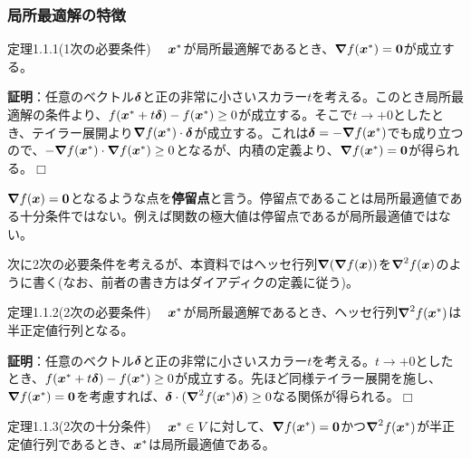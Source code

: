 \documentclass[dvipdfmx, 9pt, a4paper]{jsarticle}
\numberwithin{equation}{section}
\newcommand{\bm}[1]{{\mbox{\boldmath $#1$}}}
\newcommand{\bnabla}{\bm \nabla}
\def\qed{\hfill $\Box$}
\begin{document}
\subsubsection{局所最適解の特徴}
\begin{itembox}[l]{定理1.1.1(1次の必要条件)}
　$\bm x^*$が局所最適解であるとき、$\bnabla f(\bm x^*)=\bm 0$が成立する。
\end{itembox}
{\bf 証明}：任意のベクトル$\bm \delta$と正の非常に小さいスカラー$t$を考える。このとき局所最適解の条件より、$f(\bm x^*+t\bm \delta)-f(\bm x^*) \geq 0$が成立する。そこで$t \to +0$としたとき、テイラー展開より$\bm \nabla f(\bm x^*)\cdot \bm \delta$が成立する。これは$\bm \delta=-\bm \nabla f(\bm x^*)$でも成り立つので、$-\bm \nabla f(\bm x^*)\cdot \bm \nabla f(\bm x^*) \geq 0$となるが、内積の定義より、$\bm \nabla f(\bm x^*)=\bm 0$が得られる。\qed \par
$\bm \nabla f(\bm x)=\bm 0$となるような点を{\bf 停留点}と言う。停留点であることは局所最適値である十分条件ではない。例えば関数の極大値は停留点であるが局所最適値ではない。\par
次に2次の必要条件を考えるが、本資料ではヘッセ行列$\bm \nabla(\bm \nabla f(\bm x))$を$\bm \nabla^2f(\bm x)$のように書く(なお、前者の書き方はダイアディクの定義に従う)。
\begin{itembox}[l]{定理1.1.2(2次の必要条件)}
　$\bm x^*$が局所最適解であるとき、ヘッセ行列$\bm \nabla^2f(\bm x^*)$は半正定値行列となる。
\end{itembox}
{\bf 証明}：任意のベクトル$\bm \delta$と正の非常に小さいスカラー$t$を考える。$t \to +0$としたとき、$f(\bm x^*+t\bm \delta)-f(\bm x^*) \geq 0$が成立する。先ほど同様テイラー展開を施し、$\bm \nabla f(\bm x^*)=\bm 0$を考慮すれば、$\bm \delta \cdot (\bm \nabla^2f(\bm x^*)\bm \delta) \geq 0$なる関係が得られる。\qed
\begin{itembox}[l]{定理1.1.3(2次の十分条件)}
　$\bm x^* \in V$に対して、$\bm \nabla f(\bm x^*)=\bm 0$かつ$\bm \nabla^2f(\bm x^*)$が半正定値行列であるとき、$\bm x^*$は局所最適値である。
\end{itembox}
\end{document}
